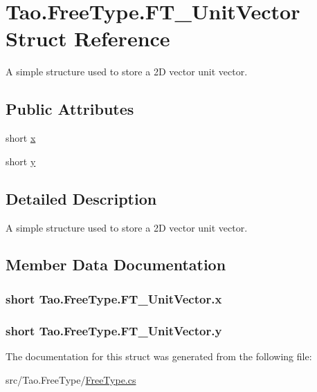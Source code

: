 \hypertarget{struct_tao_1_1_free_type_1_1_f_t___unit_vector}{
\section{Tao.FreeType.FT\_\-UnitVector Struct Reference}
\label{struct_tao_1_1_free_type_1_1_f_t___unit_vector}
}


A simple structure used to store a 2D vector unit vector.  


\subsection*{Public Attributes}
\begin{DoxyCompactItemize}
\item 
short \hyperlink{struct_tao_1_1_free_type_1_1_f_t___unit_vector_abdb19f13e1fb178b941d03f5ad2ce9c4}{x}
\item 
short \hyperlink{struct_tao_1_1_free_type_1_1_f_t___unit_vector_ab4b218d639b428f1233354f3475fa1a2}{y}
\end{DoxyCompactItemize}


\subsection{Detailed Description}
A simple structure used to store a 2D vector unit vector. 

\subsection{Member Data Documentation}
\hypertarget{struct_tao_1_1_free_type_1_1_f_t___unit_vector_abdb19f13e1fb178b941d03f5ad2ce9c4}{
\subsubsection[{x}]{\setlength{\rightskip}{0pt plus 5cm}short {\bf Tao.FreeType.FT\_\-UnitVector.x}}}
\label{struct_tao_1_1_free_type_1_1_f_t___unit_vector_abdb19f13e1fb178b941d03f5ad2ce9c4}
\hypertarget{struct_tao_1_1_free_type_1_1_f_t___unit_vector_ab4b218d639b428f1233354f3475fa1a2}{
\subsubsection[{y}]{\setlength{\rightskip}{0pt plus 5cm}short {\bf Tao.FreeType.FT\_\-UnitVector.y}}}
\label{struct_tao_1_1_free_type_1_1_f_t___unit_vector_ab4b218d639b428f1233354f3475fa1a2}


The documentation for this struct was generated from the following file:\begin{DoxyCompactItemize}
\item 
src/Tao.FreeType/\hyperlink{_free_type_8cs}{FreeType.cs}\end{DoxyCompactItemize}
